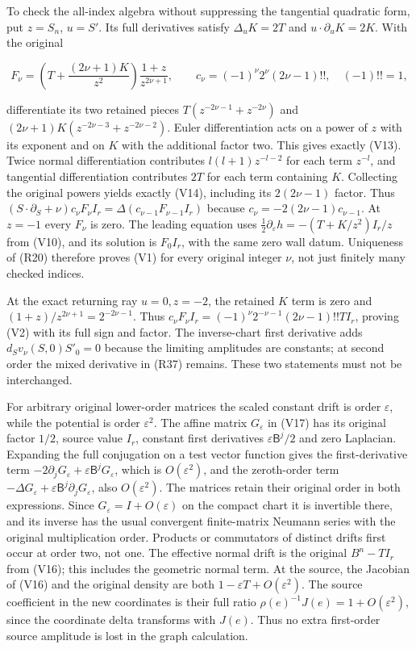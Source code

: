\documentclass[
  11pt,
]{article}
\begin{document}
To check the all-index algebra without suppressing the tangential
quadratic form, put \(z=S_n\), \(u=S'\). Its full derivatives satisfy
\(\Delta_uK=2T\) and \(u\cdot\partial_uK=2K\). With the original

\[
 F_\nu=\left(T+\frac{(2\nu+1)K}{z^2}\right)
                        \frac{1+z}{z^{2\nu+1}},\qquad
 c_\nu=(-1)^\nu2^\nu(2\nu-1)!!,\quad(-1)!!=1,\tag{FW16}
\]

differentiate its two retained pieces \(T(z^{-2\nu-1}+z^{-2\nu})\) and
\((2\nu+1)K(z^{-2\nu-3}+z^{-2\nu-2})\). Euler differentiation acts on a
power of \(z\) with its exponent and on \(K\) with the additional factor
two. This gives exactly (V13). Twice normal differentiation contributes
\(l(l+1)z^{-l-2}\) for each term \(z^{-l}\), and tangential
differentiation contributes \(2T\) for each term containing \(K\).
Collecting the original powers yields exactly (V14), including its
\(2(2\nu-1)\) factor. Thus
\((S\cdot\partial_S+\nu)c_\nu F_\nu I_r=\Delta(c_{\nu-1}F_{\nu-1}I_r)\)
because \(c_\nu=-2(2\nu-1)c_{\nu-1}\). At \(z=-1\) every \(F_\nu\) is
zero. The leading equation uses
\(\tfrac12\partial_\varepsilon h=-(T+K/z^2)I_r/z\) from (V10), and its
solution is \(F_0I_r\), with the same zero wall datum. Uniqueness of
(R20) therefore proves (V1) for every original integer \(\nu\), not just
finitely many checked indices.

At the exact returning ray \(u=0,z=-2\), the retained \(K\) term is zero
and \((1+z)/z^{2\nu+1}=2^{-2\nu-1}\). Thus
\(c_\nu F_\nu I_r=(-1)^\nu2^{-\nu-1}(2\nu-1)!!TI_r\), proving (V2) with
its full sign and factor. The inverse-chart first derivative adds
\(d_Sv_\nu(S,0)S'_0=0\) because the limiting amplitudes are constants;
at second order the mixed derivative in (R37) remains. These two
statements must not be interchanged.

For arbitrary original lower-order matrices the scaled constant drift is
order \(\varepsilon\), while the potential is order \(\varepsilon^2\).
The affine matrix \(G_\varepsilon\) in (V17) has its original factor
\(1/2\), source value \(I_r\), constant first derivatives
\(\varepsilon\mathsf B^j/2\) and zero Laplacian. Expanding the full
conjugation on a test vector function gives the first-derivative term
\(-2\partial_jG_\varepsilon+\varepsilon\mathsf B^jG_\varepsilon\), which
is \(O(\varepsilon^2)\), and the zeroth-order term
\(-\Delta G_\varepsilon+\varepsilon\mathsf B^j\partial_jG_\varepsilon\),
also \(O(\varepsilon^2)\). The matrices retain their original order in
both expressions. Since \(G_\varepsilon=I+O(\varepsilon)\) on the
compact chart it is invertible there, and its inverse has the usual
convergent finite-matrix Neumann series with the original multiplication
order. Products or commutators of distinct drifts first occur at order
two, not one. The effective normal drift is the original \(B^n-TI_r\)
from (V16); this includes the geometric normal term. At the source, the
Jacobian of (V16) and the original density are both
\(1-\varepsilon T+O(\varepsilon^2)\). The source coefficient in the new
coordinates is their full ratio \(\rho(e)^{-1}J(e)=1+O(\varepsilon^2)\),
since the coordinate delta transforms with \(J(e)\). Thus no extra
first-order source amplitude is lost in the graph calculation.
\end{document}
